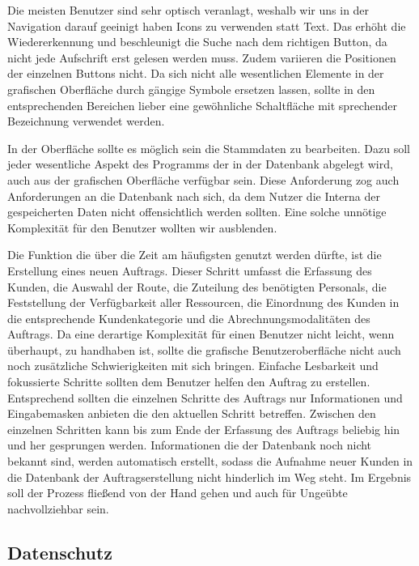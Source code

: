\documentclass[12pt]{article}
\begin{document}
Die meisten Benutzer sind sehr optisch veranlagt, weshalb wir uns in der Navigation darauf geeinigt haben Icons zu verwenden statt Text. Das erhöht die Wiedererkennung und beschleunigt die Suche nach dem richtigen Button, da nicht jede Aufschrift erst gelesen werden muss. Zudem variieren die Positionen der einzelnen Buttons nicht. Da sich nicht alle wesentlichen Elemente in der grafischen Oberfläche durch gängige Symbole ersetzen lassen, sollte in den entsprechenden Bereichen lieber eine gewöhnliche Schaltfläche mit sprechender Bezeichnung verwendet werden.
\newline

In der Oberfläche sollte es möglich sein die Stammdaten zu bearbeiten. Dazu soll jeder wesentliche Aspekt des Programms der in der Datenbank abgelegt wird, auch aus der grafischen Oberfläche verfügbar sein. Diese Anforderung zog auch Anforderungen an die Datenbank nach sich, da dem Nutzer die Interna der gespeicherten Daten nicht offensichtlich werden sollten. Eine solche unnötige Komplexität für den Benutzer wollten wir ausblenden.
\newline

Die Funktion die über die Zeit am häufigsten genutzt werden dürfte, ist die Erstellung eines neuen Auftrags. Dieser Schritt umfasst die Erfassung des Kunden, die Auswahl der Route, die Zuteilung des benötigten Personals, die Feststellung der Verfügbarkeit aller Ressourcen, die Einordnung des Kunden in die entsprechende Kundenkategorie und die Abrechnungsmodalitäten des Auftrags. Da eine derartige Komplexität für einen Benutzer nicht leicht, wenn überhaupt, zu handhaben ist, sollte die grafische Benutzeroberfläche nicht auch noch zusätzliche Schwierigkeiten mit sich bringen. Einfache Lesbarkeit und fokussierte Schritte sollten dem Benutzer helfen den Auftrag zu erstellen. Entsprechend sollten die einzelnen Schritte des Auftrags nur Informationen und Eingabemasken anbieten die den aktuellen Schritt betreffen. Zwischen den einzelnen Schritten kann bis zum Ende der Erfassung des Auftrags beliebig hin und her gesprungen werden. Informationen die der Datenbank noch nicht bekannt sind, werden automatisch erstellt, sodass die Aufnahme neuer Kunden in die Datenbank der Auftragserstellung nicht hinderlich im Weg steht. Im Ergebnis soll der Prozess fließend von der Hand gehen und auch für Ungeübte nachvollziehbar sein.

\subsection{Datenschutz}
\end{document}
